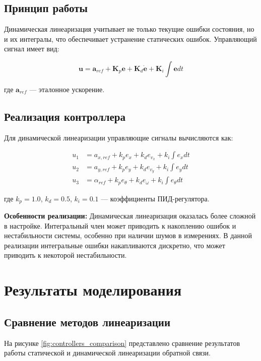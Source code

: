 \subsection{Принцип работы}

Динамическая линеаризация учитывает не только текущие ошибки состояния, но и их интегралы, что обеспечивает устранение статических ошибок. Управляющий сигнал имеет вид:

$$\mathbf{u} = \mathbf{a}_{ref} + \mathbf{K}_p \mathbf{e} + \mathbf{K}_d \dot{\mathbf{e}} + \mathbf{K}_i \int \mathbf{e} dt$$

где $\mathbf{a}_{ref}$ --- эталонное ускорение.

\subsection{Реализация контроллера}

Для динамической линеаризации управляющие сигналы вычисляются как:

\begin{align}
u_1 &= a_{x,ref} + k_p e_x + k_d e_{v_x} + k_i \int e_x dt \\
u_2 &= a_{y,ref} + k_p e_y + k_d e_{v_y} + k_i \int e_y dt \\
u_3 &= \alpha_{ref} + k_p e_\theta + k_d e_\omega + k_i \int e_\theta dt
\end{align}

где $k_p = 1.0$, $k_d = 0.5$, $k_i = 0.1$ --- коэффициенты ПИД-регулятора.

\textbf{Особенности реализации:} Динамическая линеаризация оказалась более сложной в настройке. Интегральный член может приводить к накоплению ошибок и нестабильности системы, особенно при наличии шумов в измерениях. В данной реализации интегральные ошибки накапливаются дискретно, что может приводить к некоторой нестабильности.

\section{Результаты моделирования}

\subsection{Сравнение методов линеаризации}

На рисунке \ref{fig:controllers_comparison} представлено сравнение результатов работы статической и динамической линеаризации обратной связи.

